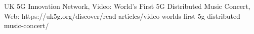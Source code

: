 UK 5G Innovation Network, Video: World's First 5G Distributed Music Concert, Web: https://uk5g.org/discover/read-articles/video-worlds-first-5g-distributed-music-concert/


%	
%	
%	
%	
%	
%	
